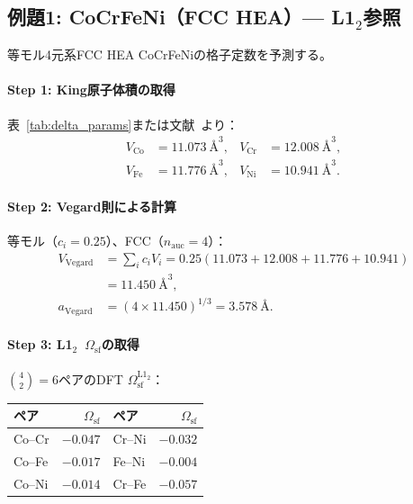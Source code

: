\documentclass[5p,10pt]{elsarticle}
\begin{document}
\subsection{例題1: CoCrFeNi（FCC HEA）--- L1$_2$参照}
\label{sec:example_fcc}

等モル4元系FCC HEA CoCrFeNiの格子定数を予測する。

\paragraph{Step 1: King原子体積の取得}

表~\ref{tab:delta_params}または文献~\cite{King1966}より：
\begin{align*}
V_\text{Co} &= 11.073~\text{\AA}^3, & V_\text{Cr} &= 12.008~\text{\AA}^3, \\
V_\text{Fe} &= 11.776~\text{\AA}^3, & V_\text{Ni} &= 10.941~\text{\AA}^3.
\end{align*}

\paragraph{Step 2: Vegard則による計算}

等モル（$c_i = 0.25$）、FCC（$n_\text{auc} = 4$）：
\begin{align}
V_\text{Vegard} &= \sum_i c_i V_i = 0.25(11.073 + 12.008 + 11.776 + 10.941) \nonumber \\
&= 11.450~\text{\AA}^3, \nonumber \\
a_\text{Vegard} &= (4 \times 11.450)^{1/3} = 3.578~\text{\AA}. \label{eq:ex_vegard_fcc}
\end{align}

\paragraph{Step 3: L1$_2$~$\Omega_\text{sf}$の取得}

$\binom{4}{2} = 6$ペアのDFT $\Omega_\text{sf}^{\text{L1}_2}$：
\begin{center}
\footnotesize
\begin{tabular}{@{}lrlr@{}}
\toprule
ペア & $\Omega_\text{sf}$ & ペア & $\Omega_\text{sf}$ \\
\midrule
Co--Cr & $-0.047$ & Cr--Ni & $-0.032$ \\
Co--Fe & $-0.017$ & Fe--Ni & $-0.004$ \\
Co--Ni & $-0.014$ & Cr--Fe & $-0.057$ \\
\bottomrule
\end{tabular}
\end{center}
\end{document}
